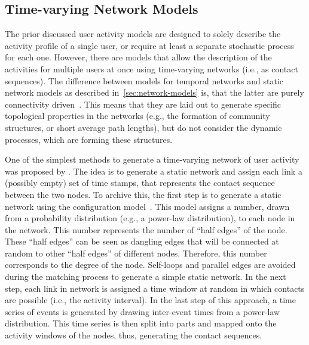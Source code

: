 \subsection{Time-varying Network Models}
\label{subsec:time-varying-network-models}

The prior discussed user activity models are designed to solely describe the activity profile of a single user, or require at least a separate stochastic process for each one.
However, there are models that allow the description of the activities for multiple users at once using time-varying networks (i.e., as contact sequences).
The difference between models for temporal networks and static network models as described in~\autoref{sec:network-models} is, that the latter are purely connectivity driven~\cite{Perra2012a}.
This means that they are laid out to generate specific topological properties in the networks (e.g., the formation of community structures, or short average path lengths), but do not consider the dynamic processes, which are forming these structures.

One of the simplest methods to generate a time-varying network of user activity was proposed by \citet{Holme2013}.
The idea is to generate a static network and assign each link a (possibly empty) set of time stamps, that represents the contact sequence between the two nodes.
To archive this, the first step is to generate a static network using the configuration model~\cite[cf. sec. 13.2]{Newman2010}.
This model assigns a number, drawn from a probability distribution (e.g., a power-law distribution), to each node in the network.
This number represents the number of \enquote{half edges} of the node.
These \enquote{half edges} can be seen as dangling edges that will be connected at random to other \enquote{half edges} of different nodes.
Therefore, this number corresponds to the degree of the node.
Self-loops and parallel edges are avoided during the matching process to generate a simple static network.
In the next step, each link in network is assigned a time window at random in which contacts are possible (i.e., the activity interval).
In the last step of this approach, a time series of events is generated by drawing inter-event times from a power-law distribution.
This time series is then split into parts and mapped onto the activity windows of the nodes, thus, generating the contact sequences.

